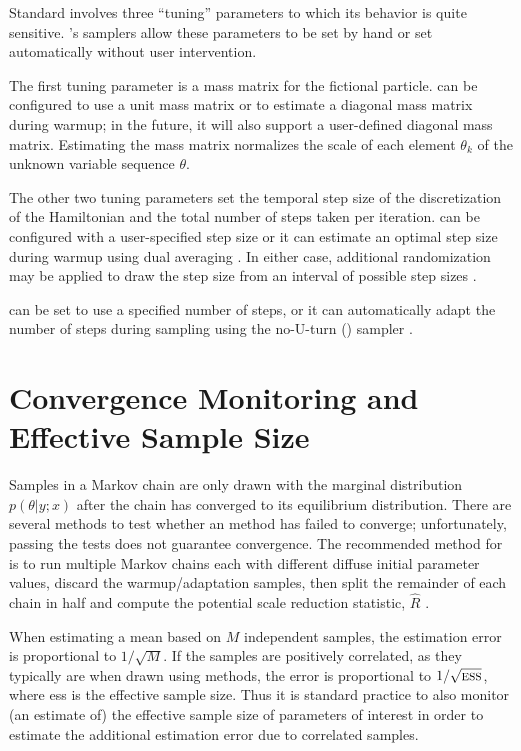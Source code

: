 Standard \HMC involves three ``tuning'' parameters to which its
behavior is quite sensitive.  \Stan's samplers allow these parameters
to be set by hand or set automatically without user intervention.

The first tuning parameter is a mass matrix for the fictional
particle.  \Stan can be configured to use a unit mass matrix or to
estimate a diagonal mass matrix during warmup; in the future, it will
also support a user-defined diagonal mass matrix.  Estimating the mass
matrix normalizes the scale of each element $\theta_k$ of the unknown
variable sequence $\theta$.

The other two tuning parameters set the temporal step size of the
discretization of the Hamiltonian and the total number of steps taken
per iteration.  \Stan can be configured with a user-specified step
size or it can estimate an optimal step size during warmup using dual
averaging \citep{Nesterov:2009, Hoffman-Gelman:2012}.  In either case, additional
randomization may be applied to draw the step size from an interval of
possible step sizes \citep{Neal:2011}.

\Stan can be set to use a specified number of steps, or it can
automatically adapt the number of steps during sampling using the
no-U-turn (\NUTS) sampler \citep{Hoffman-Gelman:2012}.  


\section{Convergence Monitoring and Effective Sample Size}

Samples in a Markov chain are only drawn with the marginal
distribution $p(\theta|y;x)$ after the chain has converged to its
equilibrium distribution.  There are several methods to test whether
an \MCMC method has failed to converge; unfortunately, passing the
tests does not guarantee convergence.  The recommended method for
\Stan is to run multiple Markov chains each with different diffuse
initial parameter values, discard the warmup/adaptation samples, then
split the remainder of each chain in half and compute the potential
scale reduction statistic, $\hat{R}$ \citep{GelmanRubin:1992}.

When estimating a mean based on $M$ independent samples, the
estimation error is proportional to $1/\sqrt{M}$.  If the samples are
positively correlated, as they typically are when drawn using \MCMC
methods, the error is proportional to $1/\sqrt{\mbox{\sc ess}}$, where
{\sc ess} is the effective sample size.  Thus it is standard practice
to also monitor (an estimate of) the effective sample size of
parameters of interest in order to estimate the additional estimation
error due to correlated samples.





